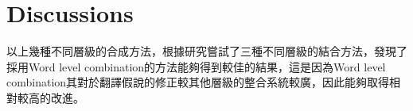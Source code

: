 








\section{Discussions}
\label{sec:discussions}

以上幾種不同層級的合成方法，根據\cite{rosti2007com}研究嘗試了三種不同層級的結合方法，發現了採用Word level combination的方法能夠得到較佳的結果，這是因為Word level combination其對於翻譯假說的修正較其他層級的整合系統較廣，因此能夠取得相對較高的改進。
